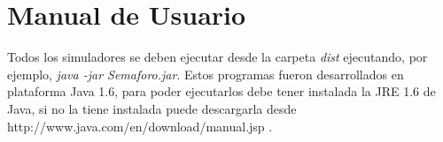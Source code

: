 \section{Manual de Usuario}
Todos los simuladores se deben ejecutar desde la carpeta \emph{dist} ejecutando, por ejemplo, \emph{java -jar Semaforo.jar}. Estos programas fueron desarrollados en plataforma Java 1.6, para poder ejecutarlos debe tener instalada la JRE 1.6 de Java, si no la tiene instalada puede descargarla desde http://www.java.com/en/download/manual.jsp .

